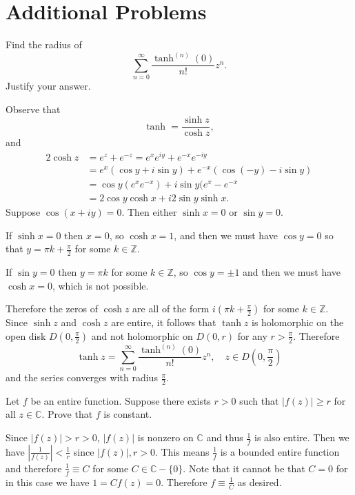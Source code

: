 \documentclass{article}
\newcounter{Problem}
\newenvironment{Problem}{\begin{Exercise}[name={Problem},
                                          counter={Problem}]}
                        {\end{Exercise}}
\begin{document}
\section{Additional Problems}
\begin{Problem}
Find the radius of
$$
\sum_{n=0}^\infty \frac{\tanh^{(n)}(0)}{n!} z^n.
$$
Justify your answer.
\end{Problem}

\begin{Answer}
Observe that
$$
\tanh = \frac{\sinh z}{\cosh z},
$$
and
\begin{align*}
   2\cosh z
&= e^z + e^{-z} = e^x e^{iy} + e^{-x} e^{-iy} \\
&= e^x (\cos y + i \sin y) + e^{-x} (\cos (-y) - i \sin y) \\
&= \cos y (e^x e^{-x}) + i \sin y (e^x - e^{-x} \\
&= 2 \cos y \cosh x + i 2 \sin y \sinh x.
\end{align*}
Suppose $\cos (x + iy) = 0$. Then either
$\sinh x = 0$ or $\sin y = 0$. 

If $\sinh x = 0$ then $x = 0$, so $\cosh x = 1$, 
and then we must have
$\cos y = 0$ so that 
$y = \pi k + \frac{\pi}{2}$ for some $k \in \mathbb{Z}$.

If $\sin y = 0$ then $y = \pi k$ for some $k \in \mathbb{Z}$,
so $\cos y = \pm 1$ and then we must have $\cosh x = 0$, which is
not possible.

Therefore the zeros of $\cosh z$ are all of the form
$i \left( \pi k + \frac{\pi}{2} \right)$ for some $k \in \mathbb{Z}$.
Since $\sinh z$ and $\cosh z$ are entire, it follows that
$\tanh z$ is holomorphic on the open disk $D\left(0, \frac{\pi}{2}\right)$
and not holomorphic on $D(0, r)$ for any $r > \frac{\pi}{2}$.
Therefore
$$
\tanh z = \sum_{n=0}^\infty \frac{\tanh^{(n)}(0)}{n!} z^n, \quad
z \in D\left(0, \frac{\pi}{2}\right)
$$
and the series converges with radius $\frac{\pi}{2}$.
\end{Answer}

\begin{Problem}
Let $f$ be an entire function. Suppose there exists $r > 0$ such that
$|f(z)| \geq r$ for all $z \in \mathbb{C}$. Prove that $f$ is constant.
\end{Problem}

\begin{Answer}
Since $|f(z)| > r > 0$, $|f(z)|$ is nonzero on $\mathbb{C}$ and thus
$\frac{1}{f}$ is also entire. Then we have
$\left|\frac{1}{f(z)}\right| < \frac{1}{r}$ since $|f(z)|, r > 0$.
This means $\frac{1}{f}$ is a bounded entire function and therefore
$\frac{1}{f} \equiv C$ for some $C \in \mathbb{C} - \{ 0 \}$.
Note that it cannot be that $C = 0$ for in this case we have 
$1 = C f(z) = 0$. Therefore $f \equiv \frac{1}{C}$ as desired.
\end{Answer}
\end{document}
